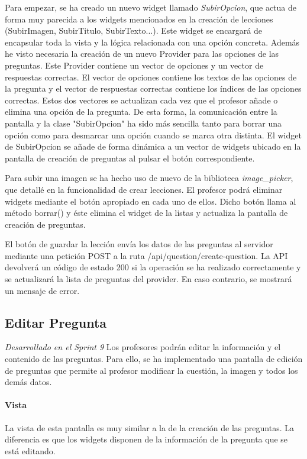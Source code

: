 Para empezar, se ha creado un nuevo widget llamado \textit{SubirOpcion}, que actua de forma muy parecida a los widgets mencionados 
en la creación de lecciones (SubirImagen, SubirTitulo, SubirTexto...). Este widget se encargará de encapsular toda la vista y la lógica relacionada con una opción concreta.
Además he visto necesaria la creación de un nuevo Provider para las opciones de las preguntas. Este Provider contiene un vector de opciones y un vector de respuestas correctas.
El vector de opciones contiene los textos de las opciones de la pregunta y el vector de respuestas correctas contiene los índices de las opciones correctas.
Estos dos vectores se actualizan cada vez que el profesor añade o elimina una opción de la pregunta. 
De esta forma, la comunicación entre la pantalla y la clase "SubirOpcion" ha sido más sencilla tanto para borrar una opción como para desmarcar una opción cuando se marca otra distinta.
El widget de SubirOpcion se añade de forma dinámica a un vector de widgets ubicado en la pantalla de creación de preguntas al pulsar el botón correspondiente.


Para subir una imagen se ha hecho uso de nuevo de la biblioteca \textit{image\_picker}, que detallé en la funcionalidad de crear lecciones.
El profesor podrá eliminar widgets mediante el botón apropiado en cada uno de ellos. Dicho botón llama al método borrar() y 
éste elimina el widget de la listas y actualiza la pantalla de creación de preguntas.

El botón de guardar la lección envía los datos de las preguntas al servidor mediante una petición POST a la ruta /api/question/create-question.
 La API devolverá un código de estado 200 si la operación se ha realizado correctamente y se actualizará la lista de preguntas del provider. 
 En caso contrario, se mostrará un mensaje de error.

\newpage

\subsection{Editar Pregunta} 

\textit{Desarrollado en el Sprint 9}
Los profesores podrán editar la información y el contenido de las preguntas. Para ello, se ha implementado una pantalla de edición 
de preguntas que permite al profesor modificar la cuestión, la imagen y todos los demás datos.

\paragraph*{Vista}
La vista de esta pantalla es muy similar a la de la creación de las preguntas. La diferencia es que los widgets disponen de la información de la pregunta que se está editando.


